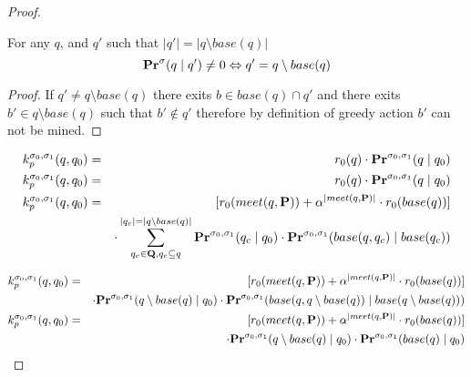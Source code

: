 \begin{proof}
	\begin{mylem}
	For any $q$, and $q'$ such that $|q'| = |q \setminus base(q)|$
	$$\mathbf{Pr}^{\sigma}(q \mid q') \neq 0 \Leftrightarrow q' = q \setminus base(q)$$
\end{mylem}
\begin{proof}
	If $q' \neq q \setminus base(q)$ there exits $b \in base(q) \cap q'$ and there exits $b' \in q \setminus base(q)$ such that $b' \notin q'$ therefore by definition of greedy action $b'$ can not be mined.
\end{proof}

\begin{eqnarray*}
	k^{\sigma_0,\sigma_1}_p(q,q_0) & = & r_0(q)\cdot \mathbf{Pr}^{\sigma_0,\sigma_1}(q \mid q_0) \\	
	k^{\sigma_0,\sigma_1}_p(q,q_0) & = & r_0(q)\cdot \mathbf{Pr}^{\sigma_0,\sigma_1}(q \mid q_0) \\	
	k^{\sigma_0,\sigma_1}_p(q,q_0) & = & [r_0(meet(q,\mathbf{P}))+\alpha^{|meet(q,\mathbf{P})|}\cdot r_0(base(q))]  \\ 
	&& \cdot \sum_{q_c \in \mathbf{Q}, q_c \subseteq q}^{|q_c| = |q \setminus base(q)|}\mathbf{Pr}^{\sigma_0,\sigma_1}(q_c \mid q_0)  \cdot  \mathbf{Pr}^{\sigma_0,\sigma_1}(base(q,q_c) \mid base(q_c)) \\		
\end{eqnarray*}









\begin{eqnarray*}
	k^{\sigma_0,\sigma_1}_p(q,q_0) & = & [r_0(meet(q,\mathbf{P}))+\alpha^{|meet(q,\mathbf{P})|}\cdot r_0(base(q))]  \\ 
	&& \cdot \mathbf{Pr}^{\sigma_0,\sigma_1}(q \setminus base(q) \mid q_0)  \cdot  \mathbf{Pr}^{\sigma_0,\sigma_1}(base(q,q \setminus base(q)) \mid base(q \setminus base(q))) \\	
	k^{\sigma_0,\sigma_1}_p(q,q_0) & = & [r_0(meet(q,\mathbf{P}))+\alpha^{|meet(q,\mathbf{P})|}\cdot r_0(base(q))]  \\ 
	&& \cdot \mathbf{Pr}^{\sigma_0,\sigma_1}(q \setminus base(q) \mid q_0)  \cdot  \mathbf{Pr}^{\sigma_0,\sigma_1}(base(q) \mid q_0) \\		
\end{eqnarray*}
	

\end{proof}
